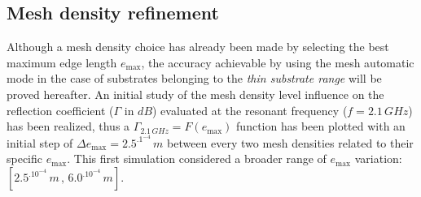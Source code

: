 \documentclass[10pt,a4paper,twocolumn]{article}
\begin{document}
{\subsection*{Mesh density refinement}
Although a mesh density choice has already been made by selecting the best maximum edge length $e_{\max}$, the accuracy achievable by using the mesh automatic mode in the case of substrates belonging to the  \emph{thin substrate range} will be proved hereafter. An initial study of the mesh density level influence on the reflection coefficient ($\Gamma$ in $dB$) evaluated at the resonant frequency ($f=2.1\,GHz$) has been realized, thus a  $\Gamma_{2.1\,GHz}=F(e_{\max})$ function has been plotted with an initial step of $\Delta e_{\max} = 2.5^.1^{-4}\,m$ between every two mesh densities related to their specific $e_{\max}$. This first simulation considered a broader range of $e_{\max}$ variation: $[2.5^.10^{-4}\,m\,,\,6.0^.10^{-4}\,m]$. 

\indent 

}
\end{document}
